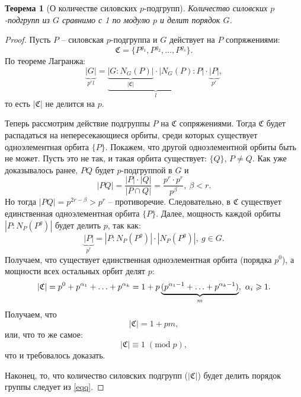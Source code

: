\documentclass{article}
\newtheorem{theorem}{Теорема}[section]
\begin{document}
\begin{theorem}[О количестве силовских $p$-подгрупп]
    Количество силовских $p$-подгрупп из $G$ сравнимо с 1 по модулю $p$ и делит порядок $G$.
\end{theorem}
\begin{proof}
    Пусть $P$ -- силовская $p$-подгруппа и $G$ действует на $P$ сопряжениями: $$ \mathfrak{C} = \{ P^{g_1}, P^{g_2}, \ldots, P^{g_s} \}. $$ По теореме Лагранжа:
    \begin{equation} \tag{*} \label{eqq}
        \underbrace{|G|}_{p^r l} = \underbrace{\underbrace{|G:N_G(P)|}_{|\mathfrak{C}|} \cdot |N_G(P) : P|}_{l} \cdot \underbrace{|P|}_{p^r},
    \end{equation}
    то есть $|\mathfrak{C}|$ не делится на $p$.

    Теперь рассмотрим действие подгруппы $P$ на $\mathfrak{C}$ сопряжениями. Тогда $\mathfrak{C}$ будет распадаться на непересекающиеся орбиты, среди которых существует одноэлементная орбита $\{ P \}$. Покажем, что другой одноэлементной орбиты быть не может. Пусть это не так, и такая орбита существует: $\{ Q \}$, $P \neq Q$. Как уже доказывалось ранее, $PQ$ будет $p$-подгруппой в $G$ и $$ |PQ| = \frac{|P| \cdot |Q|}{|P \cap Q|} = \frac{p^r \cdot p^r}{p^\beta}, \ \beta < r. $$ Но тогда $|PQ| = p^{2r - \beta} > p^r$ -- противоречие. Следовательно, в $\mathfrak{C}$ существует единственная одноэлементная орбита $\{ P \}$. Далее, мощность каждой орбиты $|P : N_P(P^g)|$ будет делить $p$, так как: $$ \underbrace{|P|}_{p^r} = |P : N_P(P^g)| \cdot |N_P(P^g)|, \ g \in G. $$ Получаем, что существует единственная одноэлементная орбита (порядка $p^0$), а мощности всех остальных орбит делят $p$:
    \[
        |\mathfrak{C}| = p^0 + p^{\alpha_1} + \ldots + p^{\alpha_k} = 1 + p\underbrace{(p^{\alpha_1 - 1} + \ldots + p^{\alpha_k - 1})}_{m}, \ \alpha_i \geqslant 1. \\
    \]
    Получаем, что $$ |\mathfrak{C}| = 1 + p m, $$ или, что то же самое: $$ |\mathfrak{C}| \equiv 1 \; (\mathrm{mod}\;p), $$ что и требовалось доказать.

     Наконец, то, что количество силовских подгрупп ($|\mathfrak{C}|$) будет делить порядок группы следует из \eqref{eqq}.
\end{proof}
\end{document}
